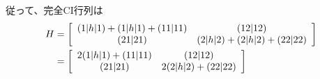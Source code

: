 従って、完全CI行列は
\begin{align}
	H
&=
	\left[
	\begin{array}{cc}
		\spaceone{1}{h}{1}
		+
		\spaceone{1}{h}{1}
		+
		\spacetwo{11}{11} &
		\spacetwo{12}{12} \\
		\spacetwo{21}{21} &
		\spaceone{2}{h}{2}
		+
		\spaceone{2}{h}{2}
		+
		\spacetwo{22}{22}
	\end{array}
	\right] \\
%
%
&=
	\left[
	\begin{array}{cc}
		2\spaceone{1}{h}{1}
		+
		\spacetwo{11}{11} &
		\spacetwo{12}{12} \\
		\spacetwo{21}{21} &
		2\spaceone{2}{h}{2}
		+
		\spacetwo{22}{22}
	\end{array}
	\right]
\end{align}


